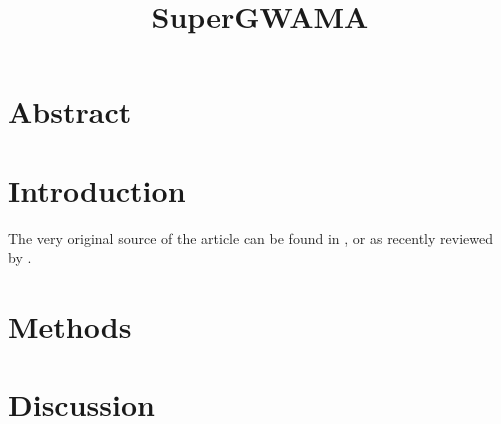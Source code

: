 \documentclass[10pt,GBK,UTF8]{article}
\date{} %
\title{SuperGWAMA}
\begin{document}
\maketitle

\newpage
\section{Abstract}

\section{Introduction}
The very original source of the article can be found in \cite{Niu2017, Chen2017, He2024}, or as recently reviewed by \cite{Kontou2024}.

\section{Methods}
\section{Discussion}
\clearpage


\end{document}
